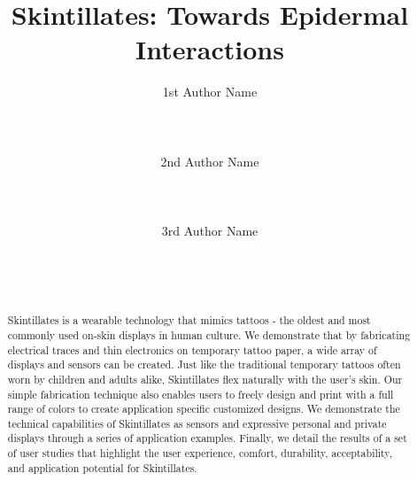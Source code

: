 \documentclass{sigchi}
\begin{document}
\title{Skintillates: Towards Epidermal Interactions}

\author{
  \alignauthor 1st Author Name\\
    \\
    \\
    \\
  \alignauthor 2nd Author Name\\
    \\
    \\
    \\
  \alignauthor 3rd Author Name\\
    \\
    \\
    \\
}

\maketitle

\begin{abstract}
Skintillates is a wearable technology that mimics tattoos - the oldest and most commonly used on-skin displays in human culture. We demonstrate that by fabricating electrical traces and thin electronics on temporary tattoo paper, a wide array of displays and sensors can be created. Just like the traditional temporary tattoos often worn by children and adults alike, Skintillates flex naturally with the user’s skin. Our simple fabrication technique also enables users to freely design and print with a full range of colors to create application specific customized designs. We demonstrate the technical capabilities of Skintillates as sensors and expressive personal and private displays through a series of application examples. Finally, we detail the results of a set of user studies that highlight the user experience, comfort, durability, acceptability, and application potential for Skintillates. 
\end{abstract}


\end{document}
